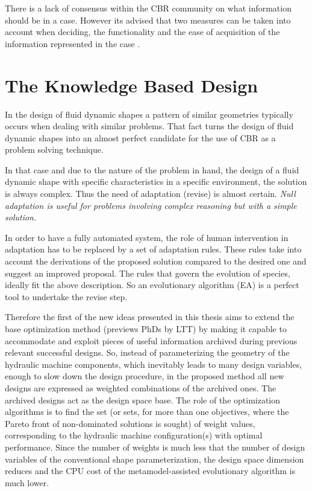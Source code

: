 There is a lack of consensus within the CBR community on what information should be in a case. However its advised that two measures can be taken into account when deciding,
 the functionality and the ease of acquisition of the information represented in the case \cite{kolodner_1993}. 


\section{The Knowledge Based Design}
In the design of fluid dynamic shapes a pattern of similar geometries typically occurs when dealing with similar problems.  
That fact turns the design of fluid dynamic shapes into an almost perfect candidate for the
use of CBR as a problem solving technique. 

In that case and due to the nature of the problem  
in hand, the design of a fluid dynamic shape with specific characteristics in a specific environment, 
the solution is always complex. Thus the need of adaptation (revise) is almost certain.  
\textit{Null adaptation is useful for problems involving complex
reasoning but with a simple solution.}

In order to have a fully automated system, the role of human intervention in adaptation has to be 
replaced by a set of adaptation rules. These rules take into account the derivations of the 
proposed solution compared to the desired one and suggest an improved proposal.
The rules that govern the evolution of species, ideally fit the above description. So an 
evolutionary algorithm (EA) is a perfect tool to undertake the revise step. 

Therefore the first of the new ideas presented in this thesis aims to extend the base optimization method (previews PhDs by LTT) by making it capable to accommodate and exploit pieces of useful information archived during previous relevant successful designs. So, instead of parameterizing the geometry of the hydraulic machine components, which inevitably leads to many design variables, enough to slow down the design procedure, in the proposed method all new designs are expressed as weighted combinations of the archived ones. The archived designs act as the design space base. The role of the optimization algorithms is to find the set (or sets, for more than one objectives, where the Pareto front of non-dominated solutions is sought) of weight values, corresponding to the hydraulic machine configuration(s) with optimal performance. Since the number of weights is much less that the number of design variables of the conventional shape parameterization, the design space dimension reduces and the CPU cost of the metamodel-assisted evolutionary algorithm is much lower.

